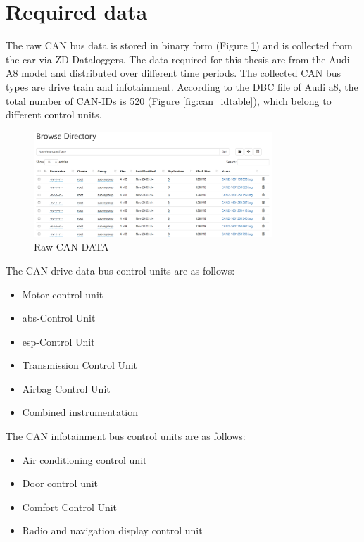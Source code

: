 \section{Required data}
The raw CAN bus data is stored in binary form (Figure \ref{fig:raw_data}) and is collected from the car via ZD-Dataloggers. The data required for this thesis are from the Audi A8 model and distributed over different time periods. The collected CAN bus types are drive train and infotainment. According to the DBC file of Audi a8, the total number of CAN-IDs is 520 (Figure \ref{fig:can_idtable}), which belong to different control units.

\begin{figure}[hbt!]
    \centering
    \includegraphics[width=0.8\textwidth]{gfx/raw_data.png}
    \caption{Raw-CAN DATA}
    \label{fig:raw_data}
\end{figure}

The CAN drive data bus control units are as follows:
\begin{itemize}
    \item Motor control unit
    \item \ac{abs}-Control Unit
    \item \ac{esp}-Control Unit
    \item Transmission Control Unit
    \item Airbag Control Unit
    \item Combined instrumentation
\end{itemize}

The CAN infotainment bus control units are as follows:
\begin{itemize}
\item Air conditioning control unit
\item Door control unit
\item Comfort Control Unit
\item Radio and navigation display control unit
\end{itemize}



